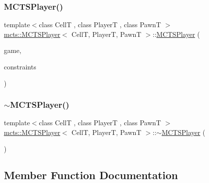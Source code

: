 \subsubsection{\texorpdfstring{M\+C\+T\+S\+Player()}{MCTSPlayer()}}
{\footnotesize\ttfamily template$<$class CellT , class PlayerT , class PawnT $>$ \\
\hyperlink{classmcts_1_1_m_c_t_s_player}{mcts\+::\+M\+C\+T\+S\+Player}$<$ CellT, PlayerT, PawnT $>$\+::\hyperlink{classmcts_1_1_m_c_t_s_player}{M\+C\+T\+S\+Player} (\begin{DoxyParamCaption}\item[{\hyperlink{classgame_1_1_abstract_game}{game\+::\+Abstract\+Game}$<$ CellT, PlayerT, PawnT $>$ $\ast$const \&}]{game,  }\item[{const \hyperlink{structmcts_1_1_m_c_t_s_constraints}{M\+C\+T\+S\+Constraints} \&}]{constraints }\end{DoxyParamCaption})\hspace{0.3cm}{\ttfamily [explicit]}}

\mbox{\label{classmcts_1_1_m_c_t_s_player_aa32a16ae9072685c09042fa9ddf1bd8d}} 
\subsubsection{\texorpdfstring{$\sim$\+M\+C\+T\+S\+Player()}{~MCTSPlayer()}}
{\footnotesize\ttfamily template$<$class CellT , class PlayerT , class PawnT $>$ \\
\hyperlink{classmcts_1_1_m_c_t_s_player}{mcts\+::\+M\+C\+T\+S\+Player}$<$ CellT, PlayerT, PawnT $>$\+::$\sim$\hyperlink{classmcts_1_1_m_c_t_s_player}{M\+C\+T\+S\+Player} (\begin{DoxyParamCaption}{ }\end{DoxyParamCaption})}



\subsection{Member Function Documentation}
\mbox{\label{classmcts_1_1_m_c_t_s_player_a48340fed9c5730f0d64ca177682f575e}} 
